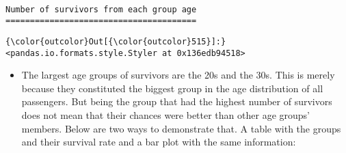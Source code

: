 \documentclass[11pt]{article}
\providecommand{\tightlist}{%
      \setlength{\itemsep}{0pt}\setlength{\parskip}{0pt}}
\begin{document}
    \begin{Verbatim}[commandchars=\\\{\}]

Number of survivors from each group age
=======================================

    \end{Verbatim}

\begin{Verbatim}[commandchars=\\\{\}]
{\color{outcolor}Out[{\color{outcolor}515}]:} <pandas.io.formats.style.Styler at 0x136edb94518>
\end{Verbatim}
            
    \begin{itemize}
\tightlist
\item
  The largest age groups of survivors are the 20s and the 30s. This is
  merely because they constituted the biggest group in the age
  distribution of all passengers. But being the group that had the
  highest number of survivors does not mean that their chances were
  better than other age groups' members. Below are two ways to
  demonstrate that. A table with the groups and their survival rate and
  a bar plot with the same information:
\end{itemize}
\end{document}
